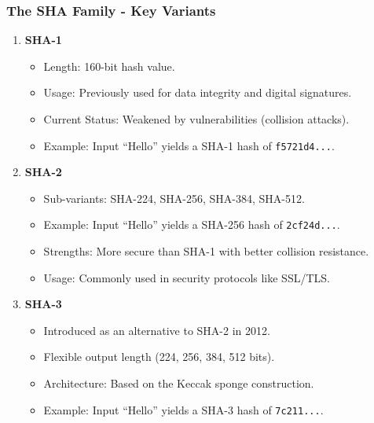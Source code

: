 \documentclass{beamer}
\begin{document}
\begin{frame}[fragile]
    \frametitle{The SHA Family - Key Variants}
    \begin{enumerate}
        \item \textbf{SHA-1}
            \begin{itemize}
                \item Length: 160-bit hash value.
                \item Usage: Previously used for data integrity and digital signatures.
                \item Current Status: Weakened by vulnerabilities (collision attacks).
                \item Example: Input ``Hello'' yields a SHA-1 hash of \texttt{f5721d4...}.
            \end{itemize}
        
        \item \textbf{SHA-2}
            \begin{itemize}
                \item Sub-variants: SHA-224, SHA-256, SHA-384, SHA-512.
                \item Example: Input ``Hello'' yields a SHA-256 hash of \texttt{2cf24d...}.
                \item Strengths: More secure than SHA-1 with better collision resistance.
                \item Usage: Commonly used in security protocols like SSL/TLS.
            \end{itemize}
        
        \item \textbf{SHA-3}
            \begin{itemize}
                \item Introduced as an alternative to SHA-2 in 2012.
                \item Flexible output length (224, 256, 384, 512 bits).
                \item Architecture: Based on the Keccak sponge construction.
                \item Example: Input ``Hello'' yields a SHA-3 hash of \texttt{7c211...}.
            \end{itemize}
    \end{enumerate}
\end{frame}
\end{document}
